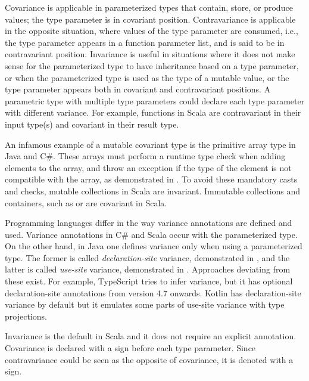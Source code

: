 Covariance is applicable in parameterized types that contain, store, or produce values; the type parameter is in covariant position. Contravariance is applicable in the opposite situation, where values of the type parameter are consumed, i.e., the type parameter appears in a function parameter list, and is said to be in contravariant position. Invariance is useful in situations where it does not make sense for the parameterized type to have inheritance based on a type parameter, or when the parameterized type is used as the type of a mutable value, or the type parameter appears both in covariant and contravariant positions. A parametric type with multiple type parameters could declare each type parameter with different variance. For example, functions in Scala are contravariant in their input type(s) and covariant in their result type.

An infamous example of a mutable covariant type is the primitive array type in Java and C\#. These arrays must perform a runtime type check when adding elements to the array, and throw an exception if the type of the element is not compatible with the array, as demonstrated in . To avoid these mandatory casts and checks, mutable collections in Scala are invariant. Immutable collections and containers, such as  or  are covariant in Scala.



Programming languages differ in the way variance annotations are defined and used. Variance annotations in C\# and Scala occur with the parameterized type. On the other hand, in Java one defines variance only when using a parameterized type. The former is called \emph{declaration-site} variance, demonstrated in , and the latter is called \emph{use-site} variance, demonstrated in . Approaches deviating from these exist. For example, TypeScript tries to infer variance, but it has optional declaration-site annotations from version 4.7 onwards. Kotlin has declaration-site variance by default but it emulates some parts of use-site variance with type projections.





Invariance is the default in Scala and it does not require an explicit annotation. Covariance is declared with a \inlinecode{+} sign before each type parameter. Since contravariance could be seen as the opposite of covariance, it is denoted with a \inlinecode{-} sign.

